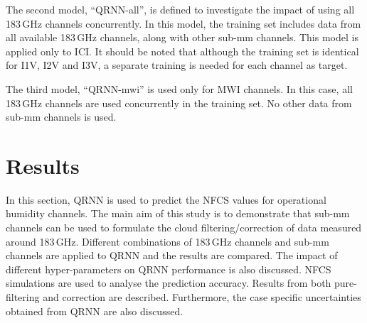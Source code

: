 \documentclass[amt, manuscript]{copernicus}
\begin{document}
The second model, ``QRNN-all'', is defined to investigate the  impact of using all 183\,GHz channels concurrently. In this model, the training set includes data from all available 183\,GHz channels, along with other sub-mm channels. This model is applied only to ICI. It should be noted that although the training set is identical for I1V, I2V and I3V, a separate training is needed for each channel as target.

The third model, ``QRNN-mwi'' is used only for MWI channels. In this case, all 183\,GHz channels are used concurrently in the training set. No other data from sub-mm channels is used. 

\section{Results}
%
In this section, QRNN is used to predict the NFCS values for operational humidity channels. The main aim of this study is to demonstrate that sub-mm channels can be used to formulate the cloud filtering/correction of data measured around 183\,GHz. Different combinations of 183\,GHz channels and sub-mm channels are applied to QRNN and the results are compared. The impact of different hyper-parameters on QRNN performance is also discussed. NFCS simulations are used to analyse the prediction accuracy. Results from both pure-filtering and correction are described. Furthermore, the case specific uncertainties obtained from QRNN are also discussed.
 
\end{document}
